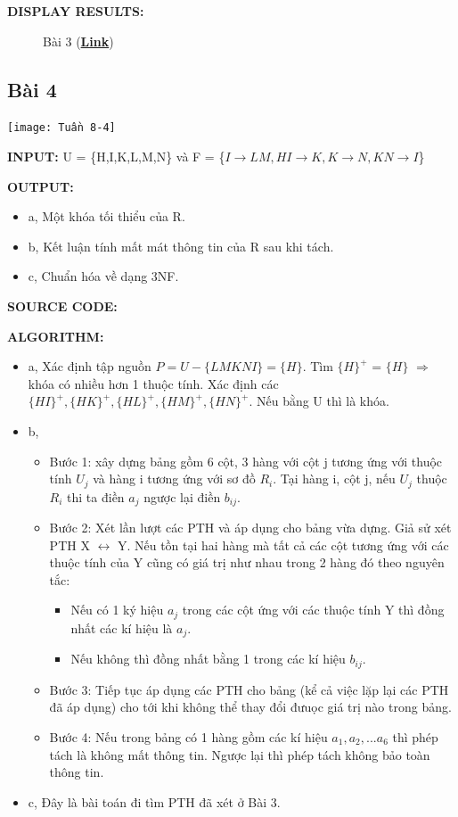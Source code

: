 \documentclass[12pt,a4paper]{report}
\begin{document}
	{\bf DISPLAY RESULTS:}
		\begin{figure}[!h]
		\hfill
		\hfill
		\caption{Bài 3 (\href{https://drive.google.com/drive/folders/18bppOD8kB9FX16mTBPA5vzgMh5qRWkda}{\bf Link})}
		\end{figure}


\subsection{Bài 4}
	\begin{center}
		\texttt{[image: Tuần 8-4]}
	\end{center}
	
	{\bf INPUT:} U = \{H,I,K,L,M,N\} và F = \{$I\rightarrow LM,HI\rightarrow K,K\rightarrow N,KN\rightarrow I$\}
	
	{\bf OUTPUT:}
	\begin{itemize}
		\item a, Một khóa tối thiểu của R.
		\item b, Kết luận tính mất mát thông tin của R sau khi tách.
		\item c, Chuẩn hóa về dạng 3NF.
	\end{itemize}
	
	{\bf SOURCE CODE:}
	
	{\bf ALGORITHM:}
	\begin{itemize}
		\item a, Xác định tập nguồn $P = U - \{LMKNI\}=\{H\}$. Tìm $\{H\}^+$ = $\{H\}$ $\Rightarrow$ khóa có nhiều hơn 1 thuộc tính. Xác định các $\{HI\}^+,\{HK\}^+,\{HL\}^+,\{HM\}^+,\{HN\}^+$. Nếu bằng U thì là khóa.
		\item b,
		\begin{itemize}
			\item Bước 1: xây dựng bảng gồm 6 cột, 3 hàng với cột j tương ứng với thuộc tính $U_j$ và hàng i tương ứng với sơ đồ $R_i$. Tại hàng i, cột j, nếu $U_j$ thuộc $R_i$ thi ta điền $a_j$ ngược lại điền $b_{ij}$.
			\item Bước 2: Xét lần lượt các PTH và áp dụng cho bảng vừa dựng. Giả sử xét PTH X $\longleftrightarrow$ Y. Nếu tồn tại hai hàng mà tất cả các cột tương ứng với các thuộc tính của Y cũng có giá trị như nhau trong 2 hàng đó theo nguyên tắc:
			\begin{itemize}
				\item Nếu có 1 ký hiệu $a_j$ trong các cột ứng với các thuộc tính Y thì đồng nhất các kí hiệu là $a_j$.
				\item Nếu không thì đồng nhất bằng 1 trong các kí hiệu $b_{ij}$.
			\end{itemize}
			\item Bước 3: Tiếp tục áp dụng các PTH cho bảng (kể cả việc lặp lại các PTH đã áp dụng) cho tới khi không thể thay đổi đưuọc giá trị nào trong bảng.
			\item Bước 4: Nếu trong bảng có 1 hàng gồm các kí hiệu $a_1,a_2,...a_6$ thì phép tách là không mất thông tin. Ngược lại thì phép tách không bảo toàn thông tin.
		\end{itemize}
		\item c, Đây là bài toán đi tìm PTH đã xét ở Bài 3.
	\end{itemize}
\end{document}
